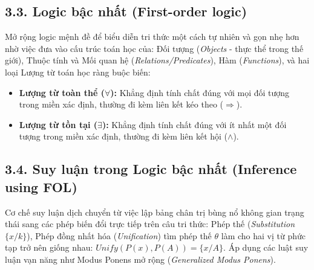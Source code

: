 \documentclass[11pt,a4paper]{article}
\begin{document}
\subsection{3.3. Logic bậc nhất (First-order logic)}
Mở rộng logic mệnh đề để biểu diễn tri thức một cách tự nhiên và gọn nhẹ hơn nhờ việc đưa vào cấu trúc toán học của: Đối tượng (\textit{Objects} - thực thể trong thế giới), Thuộc tính và Mối quan hệ (\textit{Relations/Predicates}), Hàm (\textit{Functions}), và hai loại Lượng từ toán học ràng buộc biến:
\begin{itemize}
    \item \textbf{Lượng từ toàn thể ($\forall$):} Khẳng định tính chất đúng với mọi đối tượng trong miền xác định, thường đi kèm liên kết kéo theo ($\Rightarrow$).
    \item \textbf{Lượng từ tồn tại ($\exists$):} Khẳng định tính chất đúng với ít nhất một đối tượng trong miền xác định, thường đi kèm liên kết hội ($\wedge$).
\end{itemize}

\subsection{3.4. Suy luận trong Logic bậc nhất (Inference using FOL)}
Cơ chế suy luận dịch chuyển từ việc lập bảng chân trị bùng nổ không gian trạng thái sang các phép biến đổi trực tiếp trên câu tri thức: Phép thế (\textit{Substitution} $\{x/k\}$), Phép đồng nhất hóa (\textit{Unification}) tìm phép thế $\theta$ làm cho hai vị từ phức tạp trở nên giống nhau: $Unify(P(x), P(A)) = \{x/A\}$. Áp dụng các luật suy luận vạn năng như Modus Ponens mở rộng (\textit{Generalized Modus Ponens}).
\end{document}
